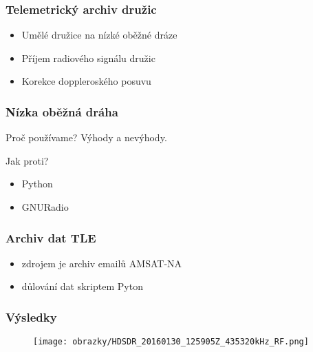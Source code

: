 \documentclass[%
  12pt,               %
  t,                  %
  aspectratio=1610,   %
  unicode,            %
czech,              %
]{beamer}              %
\begin{document}
\vypninavigacnisymboly

\vytvortitulku

\begin{frame}
  \frametitle{Telemetrický archiv družic}
  \begin{itemize}
    \item Umělé družice na nízké oběžné dráze
    \item Příjem radiového signálu družic
    \item Korekce doppleroského posuvu
  \end{itemize}
\end{frame}

\begin{frame}
  \frametitle{Nízka oběžná dráha}



  \begin{block}{Proč používame?}
    Výhody a nevýhody.
  \end{block}

  \begin{alertblock}{Jak proti?}
    \begin{itemize}
      \item Python
      \item GNURadio
    \end{itemize}
  \end{alertblock}
\end{frame}


\begin{frame}
  \frametitle{Archiv dat TLE}
    \begin{itemize}
      \item zdrojem je archiv emailů AMSAT-NA
      \item důlování dat skriptem Pyton
    \end{itemize}
\end{frame}


\begin{frame}
  \frametitle{Výsledky}
    \begin{figure}[ht]
      \centering
      \texttt{[image: obrazky/HDSDR\_20160130\_125905Z\_435320kHz\_RF.png]}
    \end{figure}
\end{frame}
\end{document}
